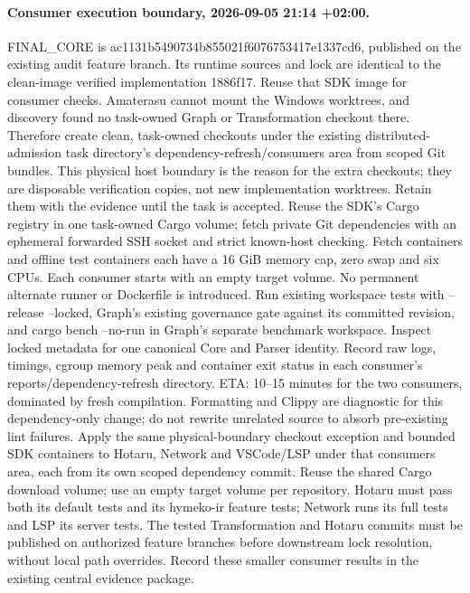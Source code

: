 \documentclass[11pt,a4paper]{article}
\begin{document}
\paragraph{Consumer execution boundary, 2026-09-05 21:14 +02:00.}
FINAL\_CORE is ac1131b5490734b855021f6076753417e1337cd6, published on the
existing audit feature branch. Its runtime sources and lock are identical to the
clean-image verified implementation 1886f17. Reuse that SDK image for consumer
checks. Amaterasu cannot mount the Windows worktrees, and discovery found no
task-owned Graph or Transformation checkout there. Therefore create clean,
task-owned checkouts under the existing distributed-admission task directory's
dependency-refresh/consumers area from scoped Git bundles. This physical host
boundary is the reason for the extra checkouts; they are disposable verification
copies, not new implementation worktrees. Retain them with the evidence until the
task is accepted. Reuse the SDK's Cargo registry in one task-owned Cargo volume;
fetch private Git dependencies with an ephemeral forwarded SSH socket and strict
known-host checking. Fetch containers and offline test containers each have a
16 GiB memory cap, zero swap and six CPUs. Each consumer starts with an empty
target volume. No permanent alternate runner or Dockerfile is introduced.
Run existing workspace tests with --release --locked, Graph's existing governance
gate against its committed revision, and cargo bench --no-run in Graph's separate
benchmark workspace. Inspect locked metadata for one canonical Core and Parser
identity. Record raw logs, timings, cgroup memory peak and container exit status
in each consumer's reports/dependency-refresh directory. ETA: 10--15 minutes for
the two consumers, dominated by fresh compilation. Formatting and Clippy are
diagnostic for this dependency-only change; do not rewrite unrelated source to
absorb pre-existing lint failures.
Apply the same physical-boundary checkout exception and bounded SDK containers
to Hotaru, Network and VSCode/LSP under that consumers area, each from its own
scoped dependency commit. Reuse the shared Cargo download volume; use an empty
target volume per repository. Hotaru must pass both its default tests and its
hymeko-ir feature tests; Network runs its full tests and LSP its server tests.
The tested Transformation and Hotaru commits must be published on authorized
feature branches before downstream lock resolution, without local path overrides.
Record these smaller consumer results in the existing central evidence package.
\end{document}
